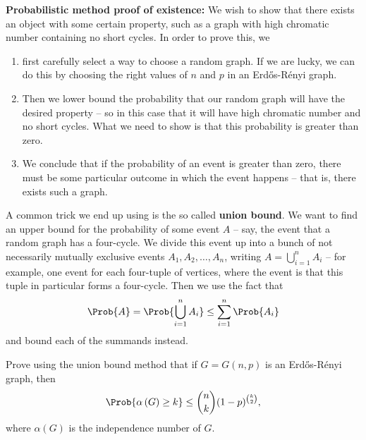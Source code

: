 \documentclass[nobib]{tufte-handout}
\begin{document}
\textbf{Probabilistic method proof of existence:} We wish to show that there exists an object with some certain property, such as a graph with high chromatic number containing no short cycles. In order to prove this, we
\begin{enumerate}
  \item first carefully select a way to choose a random graph. If we are lucky, we can do this by choosing the right values of $n$ and $p$ in an Erd\H{o}s-Rényi graph.
  \item Then we lower bound the probability that our random graph will have the desired property -- so in this case that it will have high chromatic number and no short cycles. What we need to show is that this probability is greater than zero.
  \item We conclude that if the probability of an event is greater than zero, there must be some particular outcome in which the event happens -- that is, there exists such a graph.
\end{enumerate}

A common trick we end up using is the so called \textbf{union bound}. We want to find an upper bound for the probability of some event $A$ -- say, the event that a random graph has a four-cycle. We divide this event up into a bunch of not necessarily mutually exclusive events $A_1, A_2, \ldots, A_n$, writing $A = \bigcup_{i=1}^n A_i$ -- for example, one event for each four-tuple of vertices, where the event is that this tuple in particular forms a four-cycle. Then we use the fact that
$$\Prob{A} = \Prob{\bigcup_{i=1}^n A_i} \leq \sum_{i=1}^n \Prob{A_i}$$
and bound each of the summands instead.

\begin{xca}
  Prove using the union bound method that if $G = G(n,p)$ is an Erd\H{o}s-Rényi graph, then
  $$\Prob{\alpha\left(G\right) \geq k} \leq \binom{n}{k}(1-p)^{\binom{k}{2}},$$
  where $\alpha(G)$ is the independence number of $G$.
\end{xca}
\end{document}
